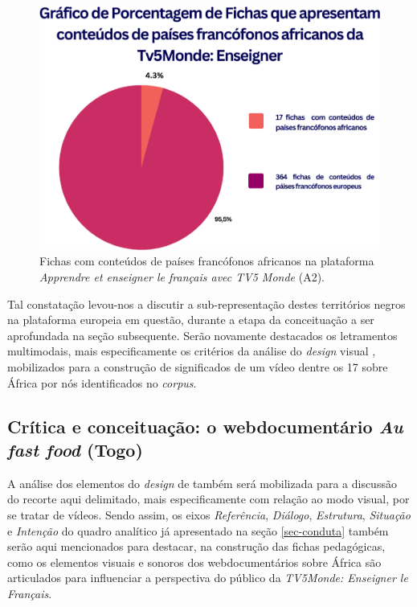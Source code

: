\documentclass[portuguese]{textolivre}
\begin{document}
\begin{figure}[h]
    \centering
    \begin{minipage}{.55\textwidth}
    \includegraphics[width=\linewidth]{Fig5.png}
    \caption{Fichas com conteúdos de países francófonos africanos na plataforma \textit{Apprendre et enseigner le français avec TV5 Monde} (A2).}
    \label{fig5}
    \end{minipage}
\end{figure}

Tal constatação levou-nos a discutir a sub-representação destes territórios negros na plataforma europeia em questão, durante a etapa da conceituação a ser aprofundada na seção subsequente. Serão novamente destacados os letramentos multimodais, mais especificamente os critérios da análise do \textit{design} visual \cite{kalantzis_letramentos_2020}, mobilizados para a construção de significados de um vídeo dentre os 17 sobre África por nós identificados no \textit{corpus}. 

\subsection{Crítica e conceituação: o webdocumentário \textit{Au fast food} (Togo)}\label{sec-organizacao}
A análise dos elementos do \textit{design} de \textcite{kalantzis_letramentos_2020} também será mobilizada para a discussão do recorte aqui delimitado, mais especificamente com relação ao modo visual, por se tratar de vídeos. Sendo assim, os eixos \emph{Referência}, \emph{Diálogo}, \emph{Estrutura}, \emph{Situação} e \emph{Intenção} do quadro analítico já apresentado na seção \ref{sec-conduta} também serão aqui mencionados para destacar, na construção das fichas pedagógicas, como os elementos visuais e sonoros dos webdocumentários sobre África são articulados para influenciar a perspectiva do público da \textit{TV5Monde: Enseigner le Français}. 
\end{document}
